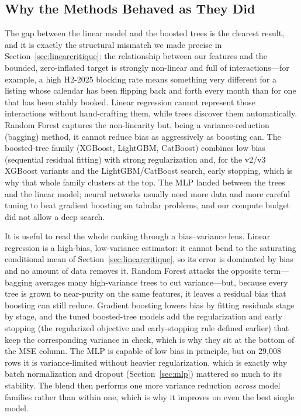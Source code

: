 \documentclass[journal]{IEEEtran}
\begin{document}
\subsection{Why the Methods Behaved as They Did}
The gap between the linear model and the boosted trees is the clearest result,
and it is exactly the structural mismatch we made precise in
Section~\ref{sec:linearcritique}: the relationship between our features and the
bounded, zero-inflated target is strongly non-linear and full of
interactions---for example, a high H2-2025 blocking rate means something very
different for a listing whose calendar has been flipping back and forth every
month than for one that has been stably booked. Linear regression cannot
represent those interactions without hand-crafting them, while trees discover
them automatically. Random Forest captures the non-linearity but, being a
variance-reduction (bagging) method, it cannot reduce bias as aggressively as
boosting can. The boosted-tree family (XGBoost, LightGBM, CatBoost) combines low
bias (sequential residual fitting) with strong regularization and, for the v2/v3
XGBoost variants and the LightGBM/CatBoost search, early stopping, which is why
that whole family clusters at the top. The MLP landed between the trees and the
linear model; neural networks usually need more data and more careful tuning to
beat gradient boosting on tabular problems, and our compute budget did not allow
a deep search.

It is useful to read the whole ranking through a bias--variance lens. Linear
regression is a high-bias, low-variance estimator: it cannot bend to the
saturating conditional mean of Section~\ref{sec:linearcritique}, so its error is
dominated by bias and no amount of data removes it. Random Forest attacks the
opposite term---bagging averages many high-variance trees to cut variance---but,
because every tree is grown to near-purity on the same features, it leaves a
residual bias that boosting can still reduce. Gradient boosting lowers bias by
fitting residuals stage by stage, and the tuned boosted-tree models add the
regularization and early stopping (the regularized objective and early-stopping
rule defined earlier) that keep the corresponding variance in check, which is why they sit at the bottom
of the MSE column. The MLP is capable of low bias in principle, but on
29{,}008 rows it is variance-limited without heavier regularization, which is
exactly why batch normalization and dropout (Section~\ref{sec:mlp}) mattered so
much to its stability. The blend then performs one more variance reduction
\emph{across} model families rather than within one, which is why it improves on
even the best single model.
\end{document}
